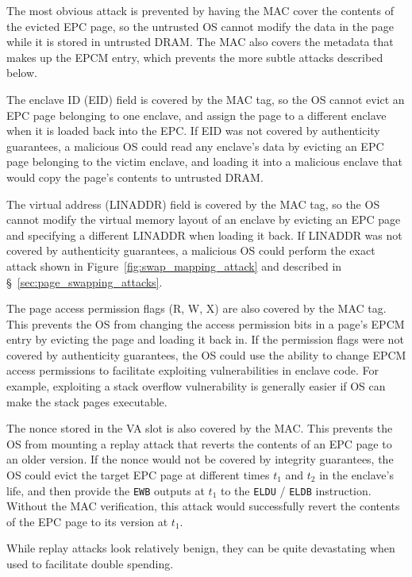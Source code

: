 The most obvious attack is prevented by having the MAC cover the contents of
the evicted EPC page, so the untrusted OS cannot modify the data in the page
while it is stored in untrusted DRAM. The MAC also covers the metadata that
makes up the EPCM entry, which prevents the more subtle attacks described
below.

The enclave ID (EID) field is covered by the MAC tag, so the OS cannot evict an
EPC page belonging to one enclave, and assign the page to a different enclave
when it is loaded back into the EPC. If EID was not covered by authenticity
guarantees, a malicious OS could read any enclave's data by evicting an EPC
page belonging to the victim enclave, and loading it into a malicious enclave
that would copy the page's contents to untrusted DRAM.

The virtual address (LINADDR) field is covered by the MAC tag, so the OS cannot
modify the virtual memory layout of an enclave by evicting an EPC page and
specifying a different LINADDR when loading it back. If LINADDR was not covered
by authenticity guarantees, a malicious OS could perform the exact attack shown
in Figure~\ref{fig:swap_mapping_attack} and described in
\S~\ref{sec:page_swapping_attacks}.

The page access permission flags (R, W, X) are also covered by the MAC tag.
This prevents the OS from changing the access permission bits in a page's EPCM
entry by evicting the page and loading it back in. If the permission flags were
not covered by authenticity guarantees, the OS could use the ability to change
EPCM access permissions to facilitate exploiting vulnerabilities in enclave
code. For example, exploiting a stack overflow vulnerability is generally
easier if OS can make the stack pages executable.

The nonce stored in the VA slot is also covered by the MAC. This prevents the
OS from mounting a replay attack that reverts the contents of an EPC page to an
older version. If the nonce would not be covered by integrity guarantees, the
OS could evict the target EPC page at different times $t_1$ and $t_2$ in the
enclave's life, and then provide the \texttt{EWB} outputs at $t_1$ to the
\texttt{ELDU} / \texttt{ELDB} instruction. Without the MAC verification, this
attack would successfully revert the contents of the EPC page to its version
at $t_1$.

While replay attacks look relatively benign, they can be quite devastating when
used to facilitate double spending.
